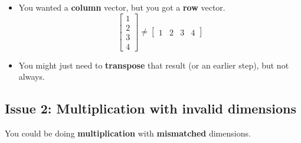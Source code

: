         \begin{itemize}
            \item \miniex You wanted a \textbf{column} vector, but you got a \textbf{row} vector. 
            \begin{equation*}
                \begin{bmatrix}
                  1\\2\\3\\4
                \end{bmatrix}
                \neq
                \begin{bmatrix}
                  1&2&3&4
                \end{bmatrix}
            \end{equation*}
            \item You might just need to \textbf{transpose} that result (or an earlier step), but not always.
        \end{itemize}
    
    \subsection*{Issue 2: Multiplication with invalid dimensions}
    
        You could be doing \textbf{multiplication} with \textbf{mismatched} dimensions. 
        
